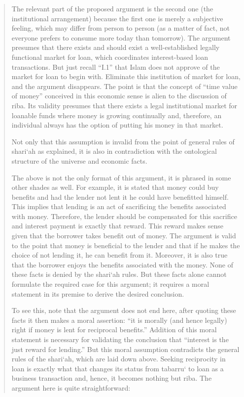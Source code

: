 \begin{quote}
The relevant part of the proposed argument is the second one (the institutional arrangement) because the first one is merely a subjective feeling, which may differ from person to person (as a matter of fact, not everyone prefers to consume more today than tomorrow). The argument presumes that there exists and should exist a well-established legally functional market for loan, which coordinates interest-based loan transactions. But just recall “I.1” that Islam does not approve of the market for loan to begin with. Eliminate this institution of market for loan, and the argument disappears. The point is that the concept of “time value of money” conceived in this economic sense is alien to the discussion of riba. Its validity presumes that there exists a legal institutional market for loanable funds where money is growing continually and, therefore, an individual always has the option of putting his money in that market.

Not only that this assumption is invalid from the point of general rules of shari‘ah as explained, it is also in contradiction with the ontological structure of the universe and economic facts.

The above is not the only format of this argument, it is phrased in some other shades as well. For example, it is stated that money could buy benefits and had the lender not lent it he could have benefitted himself. This implies that lending is an act of sacrificing the benefits associated with money. Therefore, the lender should be compensated for this sacrifice and interest payment is exactly that reward. This reward makes sense given that the borrower takes benefit out of money. The argument is valid to the point that money is beneficial to the lender and that if he makes the choice of not lending it, he can benefit from it. Moreover, it is also true that the borrower enjoys the benefits associated with the money. None of these facts is denied by the shari‘ah rules. But these facts alone cannot formulate the required case for this argument; it requires a moral statement in its premise to derive the desired conclusion.

To see this, note that the argument does not end here, after quoting these facts it then makes a moral assertion: “it is morally (and hence legally) right if money is lent for reciprocal benefits.” Addition of this moral statement is necessary for validating the conclusion that “interest is the just reward for lending.” But this moral assumption contradicts the general rules of the shari‘ah, which are laid down above. Seeking reciprocity in loan is exactly what that changes its status from tabarru‘ to loan as a business transaction and, hence, it becomes nothing but riba. The argument here is quite straightforward:


\end{quote}
